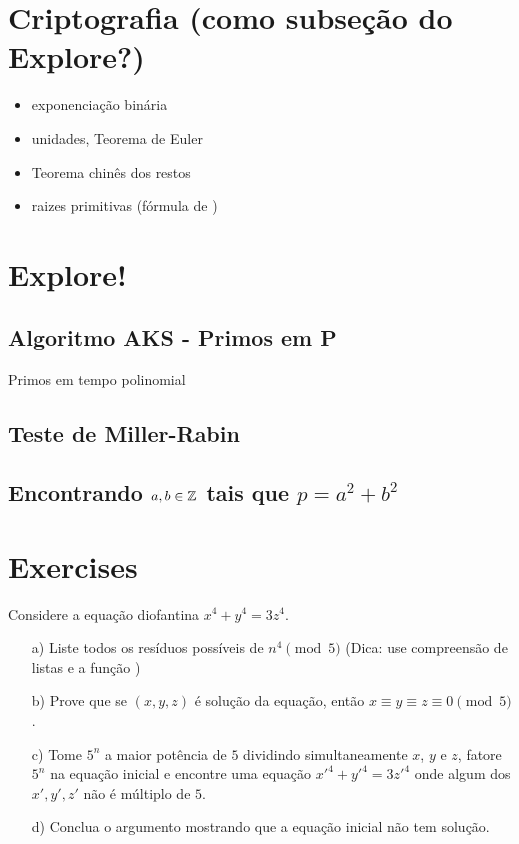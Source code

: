 \section{Criptografia (como subseção do Explore?)}
\label{sec:cripto}

\begin{itemize}
  \item exponenciação binária
  \item unidades, Teorema de Euler
  \item Teorema chinês dos restos
  \item raizes primitivas (fórmula de \cite{disquisitiones})
\end{itemize}


\section{Explore!}


\subsection{Algoritmo AKS - Primos em \textbf{P}}

Primos em tempo polinomial \cite{agrawal2004primes}


\subsection{Teste de Miller-Rabin}

\subsection{Encontrando $a,b \in \mathbb{Z}$ tais que $p = a^2 + b^2$}

\section{Exercises}

\begin{exercise}\label{ex:ecdiofcong}
  Considere a equação diofantina $x^4 + y^4 = 3z^4$.
  \begin{itemize}
    \item[a)] Liste todos os resíduos possíveis de
    $n^4 \pmod 5$ (Dica: use compreensão de listas
    e a função )
    \item[b)] Prove que se $(x,y,z)$ é solução da equação,
    então $x \equiv y \equiv z \equiv 0 \pmod 5$.
    \item[c)] Tome $5^n$ a maior potência de $5$ dividindo
    simultaneamente $x$, $y$ e $z$, fatore $5^n$ na
    equação inicial e encontre uma equação
    $x'^4 + y'^4 = 3z'^4$ onde algum dos $x',y',z'$ não
    é múltiplo de $5$.
    \item[d)] Conclua o argumento mostrando que a equação
    inicial não tem solução.
  \end{itemize}
\end{exercise}

